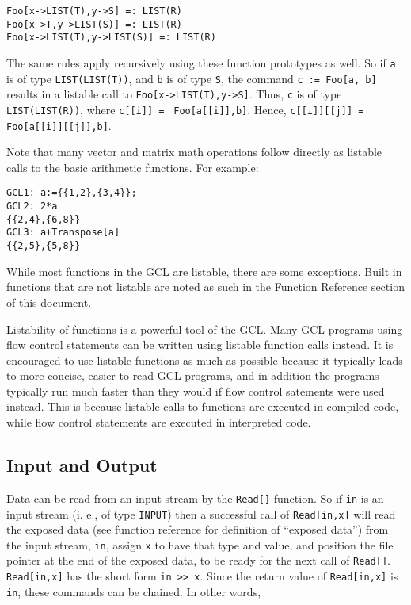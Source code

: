 \begin{verbatim}
Foo[x->LIST(T),y->S] =: LIST(R)
Foo[x->T,y->LIST(S)] =: LIST(R)
Foo[x->LIST(T),y->LIST(S)] =: LIST(R)
\end{verbatim}

The same rules apply recursively using these function prototypes as
well.  So if \verb+a+ is of type \verb+LIST(LIST(T))+, and \verb+b+ is
of type \verb+S+, the command \verb+c := Foo[a, b]+ results in a
listable call to \verb+Foo[x->LIST(T),y->S]+.  Thus, \verb+c+ is of
type \verb+LIST(LIST(R))+, where \verb+c[[i]] = +
\verb+Foo[a[[i]],b]+.  Hence, \verb+c[[i]][[j]] = +
\verb+Foo[a[[i]][[j]],b]+.

Note that many vector and matrix math operations follow directly as
listable calls to the basic arithmetic functions.  For example:

\begin{verbatim}
GCL1: a:={{1,2},{3,4}};
GCL2: 2*a
{{2,4},{6,8}}
GCL3: a+Transpose[a]
{{2,5},{5,8}}
\end{verbatim}

While most functions in the GCL are listable, there are some
exceptions.  Built in functions that are not listable are noted as
such in the Function Reference section of this document.

Listability of functions is a powerful tool of the GCL. Many GCL
programs using flow control statements can be written using listable
function calls instead.  It is encouraged to use listable functions as
much as possible because it typically leads to more concise, easier to
read GCL programs, and in addition the programs typically run much
faster than they would if flow control satements were used instead.
This is because listable calls to functions are executed in compiled
code, while flow control statements are executed in interpreted code.

\subsection{Input and Output}

Data can be read from an input stream by the \verb+Read[]+ function.
So if \verb+in+ is an input stream (i. e., of type \verb+INPUT+) then
a successful call of \verb+Read[in,x]+ will read the exposed data (see
function reference for definition of ``exposed data'') from the input
stream, \verb+in+, assign \verb+x+ to have that type and value, and
position the file pointer at the end of the exposed data, to be ready
for the next call of \verb+Read[]+.  \verb+Read[in,x]+ has the short
form \verb+in >> x+.  Since the return value of \verb+Read[in,x]+ is
\verb+in+, these commands can be chained.  In other words,

